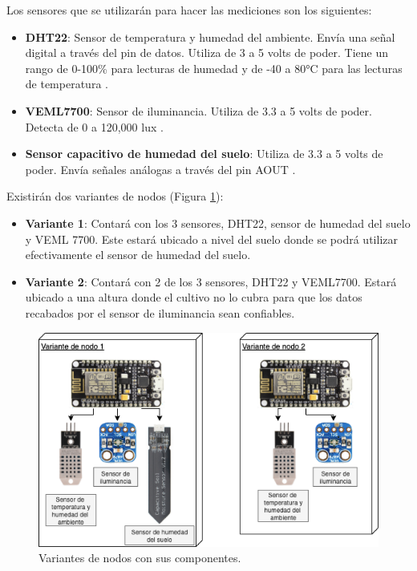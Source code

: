 \begin{itemize}
	Los sensores que se utilizarán para hacer las mediciones son los siguientes:
	\begin{itemize}
		\item \textbf{DHT22}: Sensor de temperatura y humedad del ambiente. Envía una señal digital a través del pin de datos. Utiliza de 3 a 5 volts de poder. Tiene un rango de 0-100\% para lecturas de humedad y de -40 a 80°C para las lecturas de temperatura \cite{dht22_product_page}.
		\item \textbf{VEML7700}: Sensor de iluminancia. Utiliza de 3.3 a 5 volts de poder. Detecta de 0 a 120,000 lux \cite{veml_product_page}. 
		\item \textbf{Sensor capacitivo de humedad del suelo}: Utiliza de 3.3 a 5 volts de poder. Envía señales análogas a través del pin AOUT \cite{capacitive_soil_sensor_specs}.
	\end{itemize}

	Existirán dos variantes de nodos (Figura \ref{fig:componentes_nodos_wsn}):
	\begin{itemize}
		\item \textbf{Variante 1}: Contará con los 3 sensores, DHT22, sensor de humedad del suelo y VEML 7700. Este estará ubicado a nivel del suelo donde se podrá utilizar efectivamente el sensor de humedad del suelo.
		\item \textbf{Variante 2}: Contará con 2 de los 3 sensores, DHT22 y VEML7700. Estará ubicado a una altura donde el cultivo no lo cubra para que los datos recabados por el sensor de iluminancia sean confiables.
	\end{itemize}

	\begin{figure}[!ht]
		\centering
		\includegraphics[width=.80\linewidth]{imagenes/diagramas/componentes_nodos_wsn.png}
		\caption{Variantes de nodos con sus componentes.}
		\label{fig:componentes_nodos_wsn}
	\end{figure}


\end{itemize}
